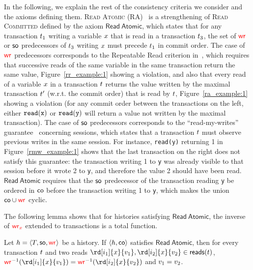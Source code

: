 In the following, we explain the rest of the consistency criteria we consider and the axioms defining them. \textsc{Read Atomic} (RA)~\cite{DBLP:conf/concur/Cerone0G15} is a strengthening of \textsc{Read Committed} defined by the axiom $\mathsf{Read\ Atomic}$, which states that for any transaction $\tr_1$ writing a variable $\xvar$ that is read in a transaction $\tr_3$, the set of $\wro$ or $\so$ predecessors of $\tr_3$ writing $\xvar$ must precede $\tr_1$ in commit order. The case of $\wro$ predecessors corresponds to the Repeatable Read criterion in~\cite{DBLP:conf/sigmod/BerensonBGMOO95}, which requires that successive reads of the same variable in the same transaction return the same value, Figure~\ref{rr_example:1} showing a violation, and also that every read of a variable $\xvar$ in a transaction $\tr$ returns the value written by the maximal transaction $\tr'$ (w.r.t. the commit order) that is read by $\tr$, Figure~\ref{ra_example:1} showing a violation (for any commit order between the transactions on the left, either ${\tt read(x)}$ or ${\tt read(y)}$ will return a value not written by the maximal transaction). The case of $\so$ predecessors corresponds to the  ``read-my-writes'' guarantee~\cite{DBLP:conf/pdis/TerryDPSTW94} concerning sessions, which states that a transaction $\tr$ must observe previous writes in the same session. For instance, {\tt read(y)} returning 1 in Figure~\ref{rmw_example:1} shows that the last transaction on the right does not satisfy this guarantee: the transaction writing 1 to {\tt y} was already visible to that session before it wrote 2 to {\tt y}, and therefore the value 2 should have been read. $\mathsf{Read\ Atomic}$ requires that the $\so$ predecessor of the transaction reading {\tt y} be ordered in $\co$ before the transaction writing 1 to {\tt y}, which makes the union $\co\cup\wro$ cyclic.

The following lemma shows that for histories satisfying $\mathsf{Read\ Atomic}$, the inverse of $\wro[\xvar]$ extended to transactions is a total function.

\begin{lemma}
 Let $\hist=\tup{T, \so, \wro}$ be a history. 
 If $\tup{\hist,\co}$ satisfies $\mathsf{Read\ Atomic}$, then %
 for every transaction $\tr$ and two reads $\rd[\id_1]{\xvar}{\val_1},\rd[\id_2]{\xvar}{\val_2}\in \readOp{\tr}$, $\wro^{-1}(\rd[\id_1]{\xvar}{\val_1})=\wro^{-1}(\rd[\id_2]{\xvar}{\val_2})$ and $\val_1 = \val_2$.
\end{lemma}

